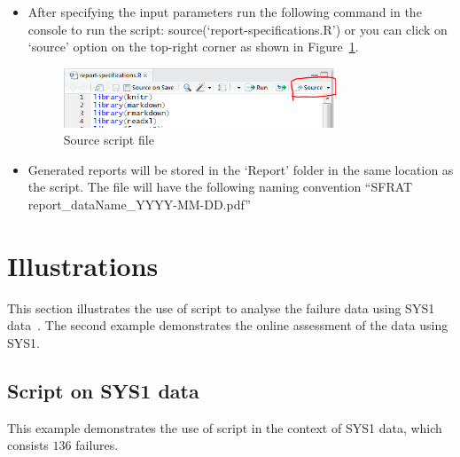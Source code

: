 \documentclass[conference]{IEEEtran}
\begin{document}
\begin{itemize}
  \item{After specifying the input parameters run the following command in the console to run the script: source(‘report-specifications.R’) or you can click on ‘source’ option on the top-right corner as shown in Figure~\ref{fig:scriptsource}.
        \begin{figure}[!h]
        \centering
        \includegraphics[width=3.2in]{Figures/scriptsource}
        \caption{Source script file}
        \label{fig:scriptsource}
        \end{figure}
  }

%
  \item {Generated reports will be stored in the `Report' folder in the same location as the script. The file will have the following naming convention ``SFRAT report\_dataName\_YYYY-MM-DD.pdf''}
\end{itemize}


\section{Illustrations}\label{sec:Ex}
This section illustrates the use of script to analyse the failure data using SYS1 data~\cite{BookHoSRE}. The second example demonstrates the online assessment of the data using SYS1.

\subsection{Script on SYS1 data}\label{sec:Ex:Script}
This example demonstrates the use of script in the context of SYS1 data, which consists $136$ failures. 
\end{document}
